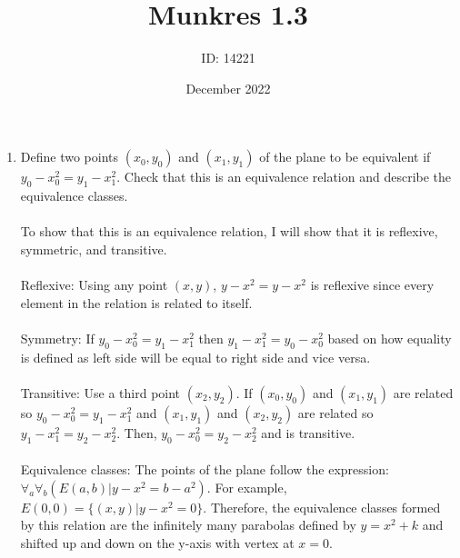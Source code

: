 \documentclass[]{article}
\date{December 2022}
\author{ID: 14221}
\title{Munkres 1.3}
\begin{document}
\maketitle

\begin{enumerate}
    \item Define two points $(x_0,y_0)$ and $(x_1,y_1)$ of the plane to be equivalent if $y_0-x^2_0=y_1-x^2_1$. Check that this is an equivalence relation and describe the equivalence classes.
    \\\\ To show that this is an equivalence relation, I will show that it is reflexive, symmetric, and transitive. 
    \\\\ Reflexive: Using any point $(x,y)$, $y-x^2=y-x^2$ is reflexive since every element in the relation is related to itself.
    \\\\ Symmetry: If $y_0-x^2_0=y_1-x^2_1$ then $y_1-x^2_1=y_0-x^2_0$ based on how equality is defined as left side will be equal to right side and vice versa.
    \\\\ Transitive: Use a third point $(x_2,y_2)$. If $(x_0,y_0)$ and $(x_1,y_1)$ are related so $y_0-x^2_0=y_1-x^2_1$ and $(x_1,y_1)$ and $(x_2,y_2)$ are related so $y_1-x^2_1=y_2-x^2_2$. Then, $y_0-x^2_0=y_2-x^2_2$ and is transitive.
    \\\\  Equivalence classes: The points of the plane follow the expression: $\forall_a \forall_b(E(a,b)|y-x^2=b-a^2)$. For example, $E(0,0)=\{(x,y)|y-x^2=0\}$. Therefore, the equivalence classes formed by this relation are the infinitely many parabolas defined by $y=x^2+k$ and shifted up and down on the y-axis with vertex at $x=0$.
    

\end{enumerate}
\end{document}
